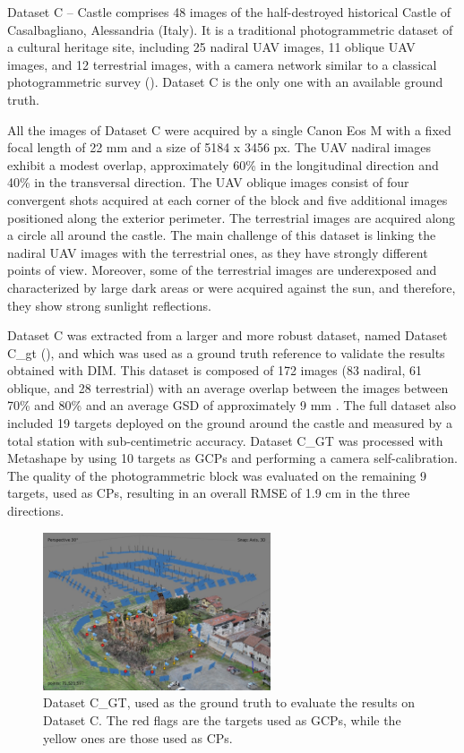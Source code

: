 Dataset C – Castle comprises 48 images of the half-destroyed historical Castle of Casalbagliano, Alessandria (Italy). 
It is a traditional photogrammetric dataset of a cultural heritage site, including 25 nadiral UAV images, 11 oblique UAV images, and 12 terrestrial images, with a camera network similar to a classical photogrammetric survey (). Dataset C is the only one with an available ground truth. 

All the images of Dataset C were acquired by a single Canon Eos M with a fixed focal length of 22 mm and a size of 5184 x 3456 px.
The UAV nadiral images exhibit a modest overlap, approximately 60\% in the longitudinal direction and 40\% in the transversal direction. 
The UAV oblique images consist of four convergent shots acquired at each corner of the block and five additional images positioned along the exterior perimeter. 
The terrestrial images are acquired along a circle all around the castle. 
The main challenge of this dataset is linking the nadiral UAV images with the terrestrial ones, as they have strongly different points of view. 
Moreover, some of the terrestrial images are underexposed and characterized by large dark areas or were acquired against the sun, and therefore, they show strong sunlight reflections. 

Dataset C was extracted from a larger and more robust dataset, named Dataset C\_\ac{gt} (), and which was used as a ground truth reference to validate the results obtained with DIM.
This dataset is composed of 172 images (83 nadiral, 61 oblique, and 28 terrestrial) with an average overlap between the images between 70\% and 80\% and an average GSD of approximately 9 mm \cite{Gagliolo2017_uav_conservation_histo, gagliolo2018_parameter_optim}. 
The full dataset also included 19 targets deployed on the ground around the castle and measured by a total station with sub-centimetric accuracy. 
Dataset C\_GT was processed with Metashape by using 10 targets as GCPs and performing a camera self-calibration. 
The quality of the photogrammetric block was evaluated on the remaining 9 targets, used as CPs, resulting in an overall RMSE of 1.9 cm in the three directions.


\begin{figure}
  \centering
    \includegraphics[width=0.6\textwidth]{castle_gt}
  \caption{Dataset C\_GT, used as the ground truth to evaluate the results on Dataset C. The red flags are the targets used as GCPs, while the yellow ones are those used as CPs.}
  \label{fig:5:castle_gt}
\end{figure}


